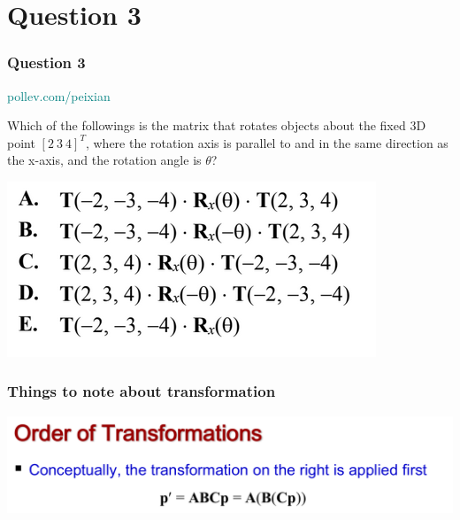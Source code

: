 \documentclass{beamer}
\begin{document}
\section{Question 3}

\begin{frame}
    \frametitle{Question 3}

    \begin{tcolorbox}[colback=teal!5!white]
        \textcolor{teal}{pollev.com/peixian}
    \end{tcolorbox}

    Which of the followings is the matrix that rotates objects about the fixed 3D point 
    $[2 \  3 \  4]^T$, where the rotation axis is parallel to and in the same direction 
    as the x-axis, and the rotation angle is $\theta$? 

    \begin{center}
        \includegraphics[scale=0.8]{q3-options.png}
    \end{center}

\end{frame}

\begin{frame}
    \frametitle{Things to note about transformation}


    \begin{center}
        \includegraphics[scale=0.4]{order-of-trans.png}
    \end{center}

\end{frame}
\end{document}
